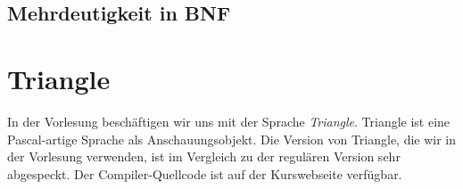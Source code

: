 \documentclass[
  ngerman,
  DIV=12
]{scrartcl}
\begin{document}

\subsection{Mehrdeutigkeit in BNF}



\section{Triangle}

In der Vorlesung beschäftigen wir uns mit der Sprache \emph{Triangle}. Triangle ist eine Pascal-artige Sprache als Anschauungsobjekt. Die Version von Triangle, die wir in der Vorlesung verwenden, ist im Vergleich zu der regulären Version sehr abgespeckt. Der Compiler-Quellcode ist auf der Kurswebseite verfügbar. 

\begin{figure}[!h]
\end{figure}
\end{document}

